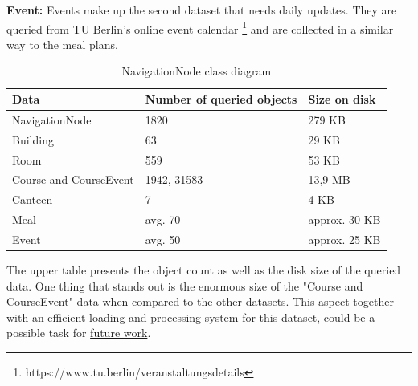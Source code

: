 \textbf{Event:} Events make up the second dataset that needs daily updates. They are queried from TU Berlin's online event calendar \footnote{https://www.tu.berlin/veranstaltungsdetails} and are collected in a similar way to the meal plans.


\begin{table}[!ht]
	\small
	\centering
	\begin{tabular}{|l|l|l|}
		\hline
		\textbf{Data}           & \textbf{Number of queried objects}     	& \textbf{Size on disk} 		\\
		\hline
        NavigationNode          & 1820	              					 	& 279 KB                        \\
		\hline
        Building                & 63              							& 29 KB                         \\
		\hline
		Room               		& 559              							& 53 KB                         \\
		\hline
		Course and CourseEvent 	& 1942, 31583              					& 13,9 MB                      	\\
		\hline
		Canteen    				& 7              							& 4 KB                          \\
		\hline
		Meal    				& avg. 70              						& approx. 30 KB                 \\
		\hline
		Event    				& avg. 50              						& approx. 25 KB               	\\
		\hline
	\end{tabular}
	\caption{NavigationNode class diagram}
\end{table}

The upper table presents the object count as well as the disk size of the queried data. One thing that stands out is the enormous size of the "Course and CourseEvent" data when compared to the other datasets. This aspect together with an efficient loading and processing system for this dataset, could be a possible task for \hyperref[sec:future_work]{future work}.

